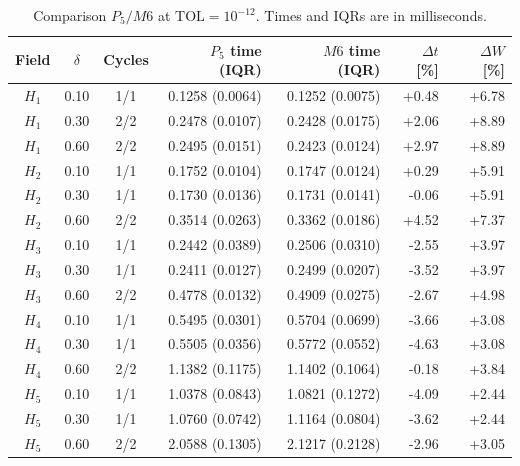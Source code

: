 \documentclass[11pt]{article}
\begin{document}
\begin{table}[htbp]\centering\small
\caption{Comparison $P_5/M6$ at $\mathrm{TOL}=10^{-12}$. Times and IQRs are in milliseconds.}\label{tab:p5}
\setlength{\tabcolsep}{4pt}
\begin{tabular}{cccrrrr}\toprule
Field & $\delta$ & Cycles & $P_5$ time (IQR) & $M6$ time (IQR) & $\Delta t$ [\%] & $\Delta W$ [\%]\\\midrule
$H_1$ & 0.10 & 1/1 & 0.1258 (0.0064) & 0.1252 (0.0075) & +0.48 & +6.78\\
$H_1$ & 0.30 & 2/2 & 0.2478 (0.0107) & 0.2428 (0.0175) & +2.06 & +8.89\\
$H_1$ & 0.60 & 2/2 & 0.2495 (0.0151) & 0.2423 (0.0124) & +2.97 & +8.89\\
$H_2$ & 0.10 & 1/1 & 0.1752 (0.0104) & 0.1747 (0.0124) & +0.29 & +5.91\\
$H_2$ & 0.30 & 1/1 & 0.1730 (0.0136) & 0.1731 (0.0141) & -0.06 & +5.91\\
$H_2$ & 0.60 & 2/2 & 0.3514 (0.0263) & 0.3362 (0.0186) & +4.52 & +7.37\\
$H_3$ & 0.10 & 1/1 & 0.2442 (0.0389) & 0.2506 (0.0310) & -2.55 & +3.97\\
$H_3$ & 0.30 & 1/1 & 0.2411 (0.0127) & 0.2499 (0.0207) & -3.52 & +3.97\\
$H_3$ & 0.60 & 2/2 & 0.4778 (0.0132) & 0.4909 (0.0275) & -2.67 & +4.98\\
$H_4$ & 0.10 & 1/1 & 0.5495 (0.0301) & 0.5704 (0.0699) & -3.66 & +3.08\\
$H_4$ & 0.30 & 1/1 & 0.5505 (0.0356) & 0.5772 (0.0552) & -4.63 & +3.08\\
$H_4$ & 0.60 & 2/2 & 1.1382 (0.1175) & 1.1402 (0.1064) & -0.18 & +3.84\\
$H_5$ & 0.10 & 1/1 & 1.0378 (0.0843) & 1.0821 (0.1272) & -4.09 & +2.44\\
$H_5$ & 0.30 & 1/1 & 1.0760 (0.0742) & 1.1164 (0.0804) & -3.62 & +2.44\\
$H_5$ & 0.60 & 2/2 & 2.0588 (0.1305) & 2.1217 (0.2128) & -2.96 & +3.05\\
\bottomrule
\end{tabular}
\end{table}
\clearpage
\end{document}
